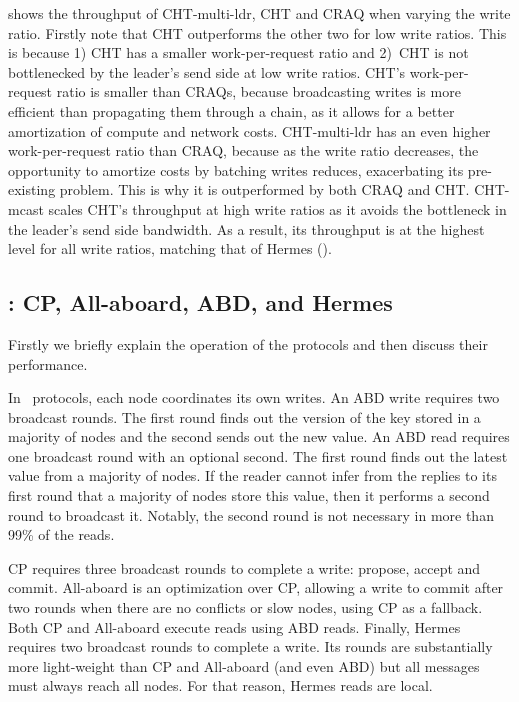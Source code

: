  shows the throughput of CHT-multi-ldr, CHT and CRAQ when varying the write ratio. Firstly note that CHT outperforms the other two for low write ratios.
This is because 1) CHT has a smaller work-per-request ratio and 2)~CHT is not bottlenecked by the leader's send side at low write ratios.
CHT's work-per-request ratio is smaller than CRAQs, because broadcasting writes is more efficient than propagating them through a chain, as it allows for a better amortization of compute and network costs.
CHT-multi-ldr has an even higher work-per-request ratio than CRAQ, because 
as the write ratio decreases, the opportunity to amortize costs by batching writes reduces, exacerbating its pre-existing problem. %
This is why it is outperformed by both CRAQ and CHT.
CHT-mcast scales CHT's throughput at high write ratios as it avoids the bottleneck in the leader's send side bandwidth.
As a result, its throughput is at the highest level for all write ratios, matching that of Hermes ().





\subsection{\DPKO: CP, All-aboard, ABD, and Hermes}\label{sec:ev:dpko}

Firstly we briefly explain the operation of the protocols and then discuss their performance.

 
In \DPKO~protocols, each node coordinates its own writes.
An ABD write requires two broadcast rounds. The first round finds out the version of the key stored in a majority of nodes and the second sends out the new value.
An ABD read requires one broadcast round with an optional second. The first round finds out the latest value from a majority of nodes. If the reader cannot infer from the replies to its first round that a majority of nodes store this value, then it performs a second round to broadcast it. Notably, the second round is not necessary in more than 99\% of the reads.

CP requires three broadcast rounds to complete a write: propose, accept and commit.
All-aboard is an optimization over CP, allowing a write to commit after two rounds when there are no conflicts or slow nodes, using CP as a fallback.
Both CP and All-aboard execute reads using ABD reads.
Finally, Hermes requires two broadcast rounds to complete a write. Its rounds are substantially more light-weight than CP and All-aboard (and even ABD) but all messages must always reach all nodes. For that reason, Hermes reads are local.



